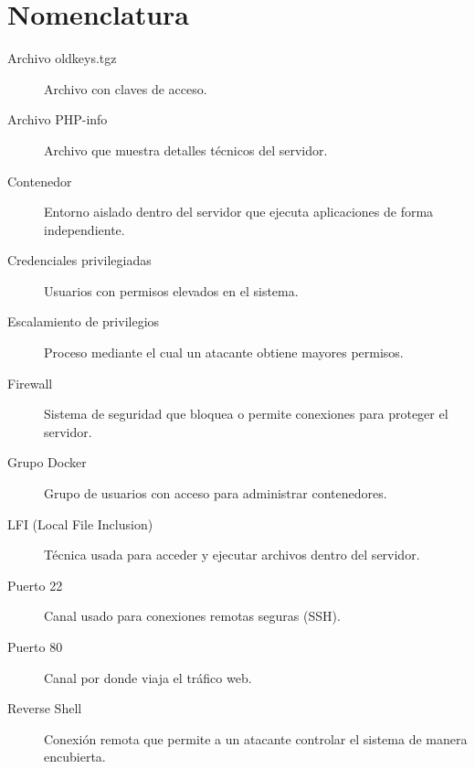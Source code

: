 \section*{Nomenclatura}
\begin{description}
    \item[Archivo oldkeys.tgz] Archivo con claves de acceso.
    \item[Archivo PHP-info] Archivo que muestra detalles técnicos del servidor.
    \item[Contenedor] Entorno aislado dentro del servidor que ejecuta aplicaciones de forma independiente.
    \item[Credenciales privilegiadas] Usuarios con permisos elevados en el sistema.
    \item[Escalamiento de privilegios] Proceso mediante el cual un atacante obtiene mayores permisos.
    \item[Firewall] Sistema de seguridad que bloquea o permite conexiones para proteger el servidor.
    \item[Grupo Docker] Grupo de usuarios con acceso para administrar contenedores.
    \item[LFI (Local File Inclusion)] Técnica usada para acceder y ejecutar archivos dentro del servidor.
    \item[Puerto 22] Canal usado para conexiones remotas seguras (SSH).
    \item[Puerto 80] Canal por donde viaja el tráfico web.
    \item[Reverse Shell] Conexión remota que permite a un atacante controlar el sistema de manera encubierta.
\end{description}

\printnomenclature